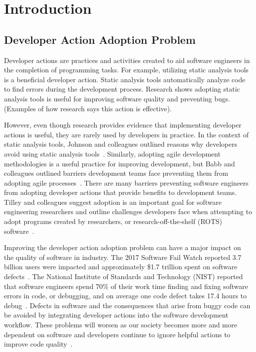 \section{Introduction}

\subsection{Developer Action Adoption Problem}

Developer actions are practices and activities created to aid software engineers in the completion of programming tasks. For example, utilizing static analysis tools is a beneficial developer action. Static analysis tools automatically analyze code to find errors during the development process. Research shows adopting static analysis tools is useful for improving software quality and preventing bugs. (Examples of how research says this action is effective).

However, even though research provides evidence that implementing developer actions is useful, they are rarely used by developers in practice. In the context of static analysis tools, Johnson and colleagues outlined reasons why developers avoid using static analysis tools~\cite{Johnson2013Why}. Similarly, adopting agile development methodologies is a useful practice for improving development, but Babb and colleagues outlined barriers development teams face preventing them from adopting agile processes~\cite{BabbAgileBarriers}. There are many barriers preventing software engineers from adopting developer actions that provide benefits to development teams. Tilley and colleagues suggest adoption is an important goal for software engineering researchers and outline challenges developers face when attempting to adopt programs created by researchers, or research-off-the-shelf (ROTS) software~\cite{Tilley2003ROTS}. 

Improving the developer action adoption problem can have a major impact on the quality of software in industry. The 2017 Software Fail Watch reported 3.7 billion users were impacted and approximately \$1.7 trillion spent on software defects~\cite{SoftwareFailWatch}. The National Institute of Standards and Technology (NIST) reported that software engineers spend 70\% of their work time finding and fixing software errors in code, or debugging, and on average one code defect takes 17.4 hours to debug~\cite{NIST}. Defects in software and the consequences that arise from buggy code can be avoided by integrating developer actions into the software development workflow. These problems will worsen as our society becomes more and more dependent on software and developers continue to ignore helpful actions to improve code quality~\cite{SoftwareEatWorld}.

